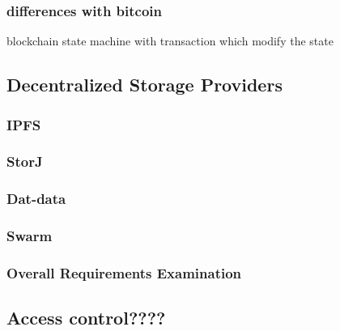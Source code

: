 \subsubsection{differences with bitcoin}
blockchain state machine with transaction which modify the state
\subsection{Decentralized Storage Providers}

\subsubsection{IPFS}

\subsubsection{StorJ}

\subsubsection{Dat-data}

\subsubsection{Swarm}

\subsubsection{Overall Requirements Examination}

\subsection{Access control????}

